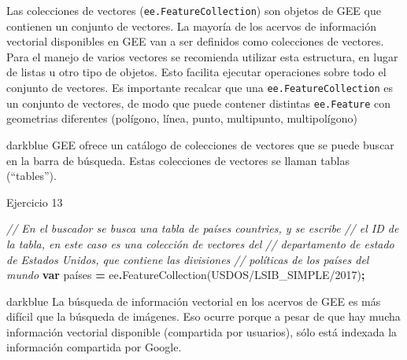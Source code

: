 \documentclass[
  12pt,
  letterpaper,
  twoside]{book}
\newenvironment{Shaded}{\begin{snugshade}}{\end{snugshade}}
\newcommand{\CommentTok}[1]{\textcolor[rgb]{0.56,0.35,0.01}{\textit{#1}}}
\newcommand{\FunctionTok}[1]{\textcolor[rgb]{0.00,0.00,0.00}{#1}}
\newcommand{\KeywordTok}[1]{\textcolor[rgb]{0.13,0.29,0.53}{\textbf{#1}}}
\newcommand{\NormalTok}[1]{#1}
\newcommand{\OperatorTok}[1]{\textcolor[rgb]{0.81,0.36,0.00}{\textbf{#1}}}
\newcommand{\StringTok}[1]{\textcolor[rgb]{0.31,0.60,0.02}{#1}}
\begin{document}
Las colecciones de vectores (\texttt{ee.FeatureCollection}) son objetos de GEE que contienen un conjunto de vectores. La mayoría de los acervos de información vectorial disponibles en GEE van a ser definidos como colecciones de vectores. Para el manejo de varios vectores se recomienda utilizar esta estructura, en lugar de listas u otro tipo de objetos. Esto facilita ejecutar operaciones sobre todo el conjunto de vectores.
Es importante recalcar que una \texttt{ee.FeatureCollection} es un conjunto de vectores, de modo que puede contener distintas \texttt{ee.Feature} con geometrias diferentes (polígono, línea, punto, multipunto, multipolígono)

\begin{bluebox2}

\begin{awesomeblock}{5pt}{\faLightbulb}{darkblue}
GEE ofrece un catálogo de colecciones de vectores que se puede buscar en la barra de búsqueda. Estas colecciones de vectores se llaman tablas (``tables'').

\end{awesomeblock}

\end{bluebox2}

Ejercicio 13

\begin{Shaded}
\begin{Highlighting}[]
\CommentTok{// En el buscador se busca una tabla de países \textquotesingle{}countries\textquotesingle{}, y se escribe }
\CommentTok{// el ID de la tabla, en este caso es una colección de vectores del }
\CommentTok{// departamento de estado de Estados Unidos, que contiene las divisiones }
\CommentTok{// políticas de los países del mundo  }
\KeywordTok{var}\NormalTok{ países }\OperatorTok{=}\NormalTok{ ee}\OperatorTok{.}\FunctionTok{FeatureCollection}\NormalTok{(}\StringTok{\textquotesingle{}USDOS/LSIB\_SIMPLE/2017\textquotesingle{}}\NormalTok{)}\OperatorTok{;}
\end{Highlighting}
\end{Shaded}

\begin{bluebox2}

\begin{awesomeblock}{5pt}{\faLightbulb}{darkblue}
La búsqueda de información vectorial en los acervos de GEE es más difícil que la búsqueda de imágenes. Eso ocurre porque a pesar de que hay mucha información vectorial disponible (compartida por usuarios), sólo está indexada la información compartida por Google.

\end{awesomeblock}

\end{bluebox2}
\end{document}
